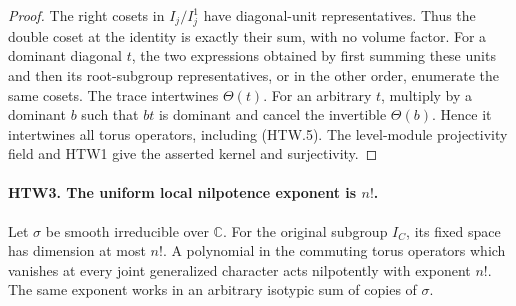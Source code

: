 \documentclass[11pt,a4paper]{article}
\numberwithin{equation}{section}
\theoremstyle{remark}\newtheorem{remark}[theorem]{Remark}
\begin{document}
\begin{proof}
The right cosets in \(I_j/I_j^1\) have diagonal-unit
representatives.  Thus the double coset at the identity
is exactly their sum, with no volume factor.  For a
dominant diagonal \(t\), the two expressions obtained
by first summing these units and then its root-subgroup
representatives, or in the other order, enumerate the
same cosets.  The trace intertwines \(\Theta(t)\).
For an arbitrary \(t\), multiply by a dominant \(b\)
such that \(bt\) is dominant and cancel the invertible
\(\Theta(b)\).  Hence it intertwines all torus operators,
including (HTW.5).  The level-module projectivity field
and HTW1 give the asserted kernel and surjectivity.
\end{proof}

\paragraph{HTW3. The uniform local nilpotence exponent is \(n!\).}
\label{claim:HTW3}
Let \(\sigma\) be smooth irreducible over \(\mathbb C\).
For the original subgroup \(I_C\), its fixed space has
dimension at most \(n!\).  A polynomial in the commuting
torus operators which vanishes at every joint generalized
character acts nilpotently with exponent \(n!\).
The same exponent works in an arbitrary isotypic sum of
copies of \(\sigma\).
\end{document}
